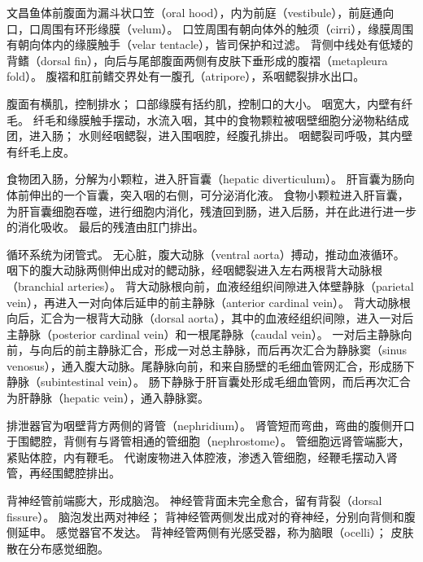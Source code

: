 \documentclass[11pt]{article}
\begin{document}
文昌鱼体前腹面为漏斗状口笠（oral hood），内为前庭（vestibule），前庭通向口，口周围有环形缘膜（velum）。
口笠周围有朝向体外的触须（cirri），缘膜周围有朝向体内的缘膜触手（velar tentacle），皆司保护和过滤。
背侧中线处有低矮的背鳍（dorsal fin），向后与尾部腹面两侧有皮肤下垂形成的腹褶（metapleura fold）。
腹褶和肛前鳍交界处有一腹孔（atripore），系咽鳃裂排水出口。

\newline

腹面有横肌，控制排水；
口部缘膜有括约肌，控制口的大小。
咽宽大，内壁有纤毛。
纤毛和缘膜触手摆动，水流入咽，其中的食物颗粒被咽壁细胞分泌物粘结成团，进入肠；
水则经咽鳃裂，进入围咽腔，经腹孔排出。
咽鳃裂司呼吸，其内壁有纤毛上皮。

\newline

食物团入肠，分解为小颗粒，进入肝盲囊（hepatic diverticulum）。
肝盲囊为肠向体前伸出的一个盲囊，突入咽的右侧，可分泌消化液。
食物小颗粒进入肝盲囊，为肝盲囊细胞吞噬，进行细胞内消化，残渣回到肠，进入后肠，并在此进行进一步的消化吸收。
最后的残渣由肛门排出。

\newline

循环系统为闭管式。
无心脏，腹大动脉（ventral aorta）搏动，推动血液循环。
咽下的腹大动脉两侧伸出成对的鳃动脉，经咽鳃裂进入左右两根背大动脉根（branchial arteries）。
背大动脉根向前，血液经组织间隙进入体壁静脉（parietal vein），再进入一对向体后延申的前主静脉（anterior cardinal vein）。
背大动脉根向后，汇合为一根背大动脉（dorsal aorta），其中的血液经组织间隙，进入一对后主静脉（posterior cardinal vein）和一根尾静脉（caudal vein）。
一对后主静脉向前，与向后的前主静脉汇合，形成一对总主静脉，而后再次汇合为静脉窦（sinus venosus），通入腹大动脉。尾静脉向前，和来自肠壁的毛细血管网汇合，形成肠下静脉（subintestinal vein）。
肠下静脉于肝盲囊处形成毛细血管网，而后再次汇合为肝静脉（hepatic vein），通入静脉窦。

\newline

排泄器官为咽壁背方两侧的肾管（nephridium）。
肾管短而弯曲，弯曲的腹侧开口于围鳃腔，背侧有与肾管相通的管细胞（nephrostome）。
管细胞远肾管端膨大，紧贴体腔，内有鞭毛。
代谢废物进入体腔液，渗透入管细胞，经鞭毛摆动入肾管，再经围鳃腔排出。

\newline

背神经管前端膨大，形成脑泡。
神经管背面未完全愈合，留有背裂（dorsal fissure）。
脑泡发出两对神经；
背神经管两侧发出成对的脊神经，分别向背侧和腹侧延申。
感觉器官不发达。
背神经管两侧有光感受器，称为脑眼（ocelli）；
皮肤散在分布感觉细胞。
\end{document}
